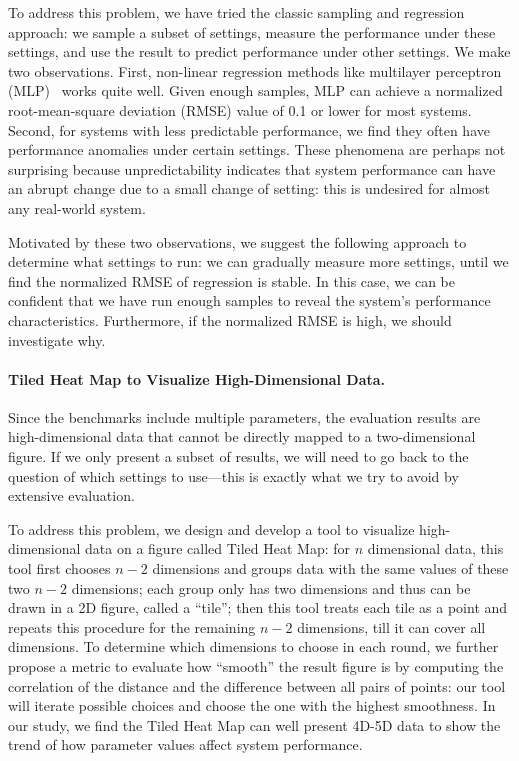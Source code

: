 To address this problem,
we have tried the classic sampling and regression approach: we sample a subset of
settings, measure the performance under these
settings, and use the result to predict performance under other settings.
We make two observations. First, non-linear regression methods like 
multilayer perceptron (MLP)~\cite{MLP1998}
works quite well. Given enough samples, MLP can achieve a normalized root-mean-square deviation (RMSE) value of 0.1 or lower for most systems.
Second, for systems with less predictable performance, we find they often
have performance anomalies under certain settings.
These phenomena are perhaps not surprising because unpredictability indicates
that system performance can have an abrupt change due to a small change of setting:
this is undesired for almost any real-world system.

Motivated by these two observations, we suggest the following approach to determine
what settings to run: we can gradually measure more settings, until we find 
the normalized RMSE of regression is stable. In this case, we can be
confident that we have run enough samples to reveal the system's performance
characteristics. Furthermore, if the normalized RMSE is high,
we should investigate why. 

\vspace{-.1in}
\paragraph{Tiled Heat Map to Visualize High-Dimensional Data.}
Since the benchmarks include multiple
parameters, the evaluation results are high-dimensional data that cannot
be directly mapped to a two-dimensional figure. If we only present a subset
of results, we will need to go back to the question of which settings
to use---this is exactly what we try to avoid by
extensive evaluation. 

To address this problem,
we design and develop a tool to visualize high-dimensional data on
a figure called Tiled Heat Map: for $n$ dimensional
data, this tool first chooses $n-2$ dimensions and groups data with the same
values of these two $n-2$ dimensions; each group only has two
dimensions and thus can be drawn in a 2D figure, called a ``tile'';
then this tool treats each tile as a point and repeats this procedure for
the remaining $n-2$ dimensions, till it can cover all dimensions.
To determine which dimensions to choose in each round, we further
propose a metric to evaluate how ``smooth'' the result
figure is by computing the correlation of the distance and
the difference between all pairs of points: our tool will iterate
possible choices and choose the one with the highest smoothness.
In our study, we find the Tiled Heat Map can well present 4D-5D data to
show the trend of how parameter values affect system
performance.


